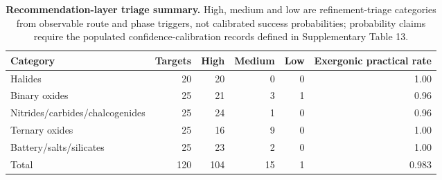 \documentclass[11pt, letterpaper]{article}
\begin{document}
\begin{table}[p]
\centering
\small
\caption{\textbf{Failure-mode diagnostics for DOI-backed literature routes.} Literature routes are grouped by precursor class. Counts are overlapping because one route can contain multiple precursor classes.}
\label{supp-tab:failure_modes}
\end{table}

\begin{table}[p]
\centering
\small
\caption{\textbf{Recommendation-layer triage summary.} High, medium and low are refinement-triage categories from observable route and phase triggers, not calibrated success probabilities; probability claims require the populated confidence-calibration records defined in Supplementary Table 13.}
\begin{tabular}{lrrrrr}
\toprule
\textbf{Category} & \textbf{Targets} & \textbf{High} & \textbf{Medium} & \textbf{Low} & \textbf{Exergonic practical rate} \\
\midrule
Halides & 20 & 20 & 0 & 0 & 1.00 \\
Binary oxides & 25 & 21 & 3 & 1 & 0.96 \\
Nitrides/carbides/chalcogenides & 25 & 24 & 1 & 0 & 0.96 \\
Ternary oxides & 25 & 16 & 9 & 0 & 1.00 \\
Battery/salts/silicates & 25 & 23 & 2 & 0 & 1.00 \\
\midrule
Total & 120 & 104 & 15 & 1 & 0.983 \\
\bottomrule
\end{tabular}
\label{supp-tab:recommendation_summary}
\end{table}
\end{document}
